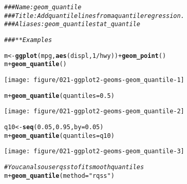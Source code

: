 \documentclass[a4paper,titlepage]{tufte-handout}\usepackage[]{graphicx}\usepackage[]{color}
\makeatletter
\def\maxwidth{ %
  \ifdim\Gin@nat@width>\linewidth
    \linewidth
  \else
    \Gin@nat@width
  \fi
}
\newcommand{\hlnum}[1]{\textcolor[rgb]{0.686,0.059,0.569}{#1}}%
\newcommand{\hlstr}[1]{\textcolor[rgb]{0.192,0.494,0.8}{#1}}%
\newcommand{\hlcom}[1]{\textcolor[rgb]{0.678,0.584,0.686}{\textit{#1}}}%
\newcommand{\hlopt}[1]{\textcolor[rgb]{0,0,0}{#1}}%
\newcommand{\hlstd}[1]{\textcolor[rgb]{0.345,0.345,0.345}{#1}}%
\newcommand{\hlkwb}[1]{\textcolor[rgb]{0.69,0.353,0.396}{#1}}%
\newcommand{\hlkwc}[1]{\textcolor[rgb]{0.333,0.667,0.333}{#1}}%
\newcommand{\hlkwd}[1]{\textcolor[rgb]{0.737,0.353,0.396}{\textbf{#1}}}%
\newenvironment{kframe}{%
 \def\at@end@of@kframe{}%
 \ifinner\ifhmode%
  \def\at@end@of@kframe{\end{minipage}}%
  \begin{minipage}{\columnwidth}%
 \fi\fi%
 \def\FrameCommand##1{\hskip\@totalleftmargin \hskip-\fboxsep
 \colorbox{shadecolor}{##1}\hskip-\fboxsep
     \hskip-\linewidth \hskip-\@totalleftmargin \hskip\columnwidth}%
 \MakeFramed {\advance\hsize-\width
   \@totalleftmargin\z@ \linewidth\hsize
   \@setminipage}}%
 {\par\unskip\endMakeFramed%
 \at@end@of@kframe}
\newenvironment{knitrout}{}{} %
\makeatother
\begin{document}
\begin{knitrout}
\color{fgcolor}\begin{kframe}
\begin{alltt}
\hlcom{### Name: geom_quantile}
\hlcom{### Title: Add quantile lines from a quantile regression.}
\hlcom{### Aliases: geom_quantile stat_quantile}

\hlcom{### ** Examples}

\hlstd{m} \hlkwb{<-} \hlkwd{ggplot}\hlstd{(mpg,} \hlkwd{aes}\hlstd{(displ,} \hlnum{1} \hlopt{/} \hlstd{hwy))} \hlopt{+} \hlkwd{geom_point}\hlstd{()}
\hlstd{m} \hlopt{+} \hlkwd{geom_quantile}\hlstd{()}
\end{alltt}


{\ttfamily\noindent\color{warningcolor}{\#\# Warning: Computation failed in `stat\_quantile()`:\\\#\# Package `quantreg` required for `stat\_quantile`.\\\#\# Please install and try again.}}\end{kframe}
\texttt{[image: figure/021-ggplot2-geoms-geom\_quantile-1]} 
\begin{kframe}\begin{alltt}
\hlstd{m} \hlopt{+} \hlkwd{geom_quantile}\hlstd{(}\hlkwc{quantiles} \hlstd{=} \hlnum{0.5}\hlstd{)}
\end{alltt}


{\ttfamily\noindent\color{warningcolor}{\#\# Warning: Computation failed in `stat\_quantile()`:\\\#\# Package `quantreg` required for `stat\_quantile`.\\\#\# Please install and try again.}}\end{kframe}
\texttt{[image: figure/021-ggplot2-geoms-geom\_quantile-2]} 
\begin{kframe}\begin{alltt}
\hlstd{q10} \hlkwb{<-} \hlkwd{seq}\hlstd{(}\hlnum{0.05}\hlstd{,} \hlnum{0.95}\hlstd{,} \hlkwc{by} \hlstd{=} \hlnum{0.05}\hlstd{)}
\hlstd{m} \hlopt{+} \hlkwd{geom_quantile}\hlstd{(}\hlkwc{quantiles} \hlstd{= q10)}
\end{alltt}


{\ttfamily\noindent\color{warningcolor}{\#\# Warning: Computation failed in `stat\_quantile()`:\\\#\# Package `quantreg` required for `stat\_quantile`.\\\#\# Please install and try again.}}\end{kframe}
\texttt{[image: figure/021-ggplot2-geoms-geom\_quantile-3]} 
\begin{kframe}\begin{alltt}
\hlcom{# You can also use rqss to fit smooth quantiles}
\hlstd{m} \hlopt{+} \hlkwd{geom_quantile}\hlstd{(}\hlkwc{method} \hlstd{=} \hlstr{"rqss"}\hlstd{)}
\end{alltt}



\end{kframe}
\end{knitrout}
\end{document}
